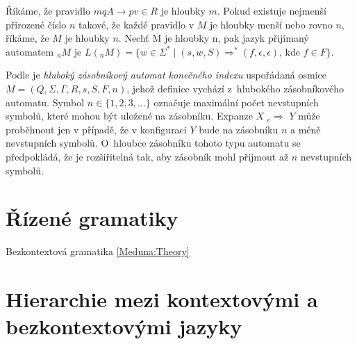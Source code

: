 \begin{Def}
Říkáme, že pravidlo $mqA \rightarrow pv \in R$ je hloubky $m$. Pokud existuje nejmenší přirozené číslo $n$ takové, že každé pravidlo v $M$ je hloubky menší nebo rovno $n$, říkáme, že $M$ je hloubky $n$. Nechť M je hloubky n, pak jazyk přijímaný automatem ${}_nM$ je $L({}_nM) = \{ w \in \Sigma^* \mid (s,w,S) \Rightarrow^* (f, \epsilon, \epsilon)$, kde $f \in F \}$.


\end{Def}


\begin{Def} Podle \cite{Meduna:FinitelyDeepPDA} je \emph{hluboký zásobníkový automat konečného indexu} uspořádaná osmice $M = (Q,\Sigma,\Gamma, R, s, S, F, n)$, jehož definice vychází z~hlubokého zásobníkového automatu. Symbol $n \in \{1,2,3,\dots\}$ označuje maximální počet nevstupních symbolů, které mohou být uložené na zásobníku. Expanze $X$  ${}_e{\Rightarrow}$  $Y$ může proběhnout jen v případě, že v konfiguraci $Y$ bude na zásobníku $n$ a méně nevstupních symbolů.  O~hloubce zásobníku tohoto typu automatu se předpokládá, že je rozšiřitelná tak, aby zásobník mohl přijmout až $n$ nevstupních symbolů.



\end{Def}


\section{Řízené gramatiky}

\begin{Def}
Bezkontextová gramatika \ref{Meduna:Theory} 
\end{Def}

\begin{Def}
\end{Def}


\begin{Def}
\end{Def}


\begin{Def}
\end{Def}


\section{Hierarchie mezi kontextovými a bezkontextovými jazyky}

